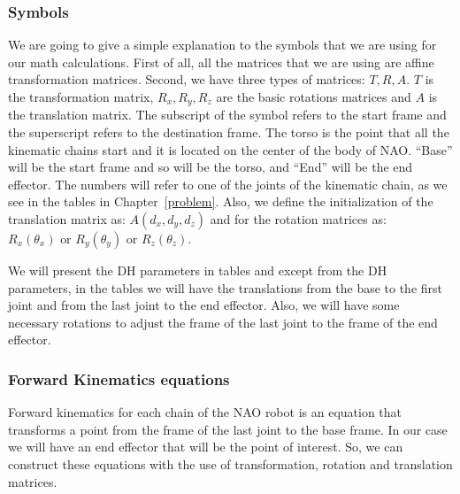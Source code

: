 \subsubsection*{Symbols}
We are going to give a simple explanation to the symbols that we are using for our math calculations. First of all, all the matrices that we are using are affine transformation matrices. Second, we have three types of matrices: $T,R,A$. $T$ is the transformation matrix, $R_x, R_y, R_z$ are the basic rotations matrices and $A$ is the translation matrix. The subscript of the symbol refers to the start frame and the superscript refers to the destination frame. The torso is the point that all the kinematic chains start and it is located on the center of the body of NAO. ``Base'' will be the start frame and so will be the torso, and ``End'' will be the end effector. The numbers will refer to one of the joints of the kinematic chain, as we see in the tables in Chapter~\ref{problem}. Also, we define the initialization of the translation matrix as: $A(d_x,d_y,d_z)$ and for the rotation matrices as: $R_x(\theta_x) \text{ or } R_y(\theta_y) \text{ or } R_z(\theta_z)$.

We will present the DH parameters in tables and except from the DH parameters, in the tables we will have the translations from the base to the first joint and from the last joint to the end effector. Also, we will have some necessary rotations to adjust the frame of the last joint to the frame of the end effector.


\subsubsection*{Forward Kinematics equations}
Forward kinematics for each chain of the NAO robot is an equation that transforms a point from the frame of the last joint to the base frame. In our case we will have an end effector that will be the point of interest. So, we can construct these equations with the use of transformation, rotation and translation matrices.

